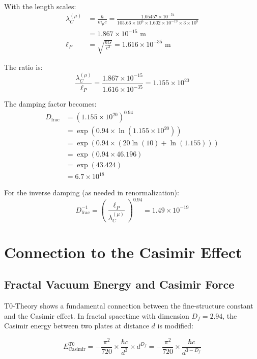 \documentclass[12pt,a4paper]{article}
\theoremstyle{definition}
\begin{document}
	With the length scales:
	\begin{align}
		\lambda_C^{(\mu)} &= \frac{\hbar}{m_\mu c} = \frac{1.05457 \times 10^{-34}}{105.66 \times 10^6 \times 1.602 \times 10^{-19} \times 3 \times 10^8}\\
		&= 1.867 \times 10^{-15} \text{ m}\\
		\ell_P &= \sqrt{\frac{\hbar G}{c^3}} = 1.616 \times 10^{-35} \text{ m}
	\end{align}
	
	The ratio is:
	\begin{equation}
		\frac{\lambda_C^{(\mu)}}{\ell_P} = \frac{1.867 \times 10^{-15}}{1.616 \times 10^{-35}} = 1.155 \times 10^{20}
	\end{equation}
	
	The damping factor becomes:
	\begin{align}
		D_{\text{frac}} &= \left(1.155 \times 10^{20}\right)^{0.94}\\
		&= \exp(0.94 \times \ln(1.155 \times 10^{20}))\\
		&= \exp(0.94 \times (20 \ln(10) + \ln(1.155)))\\
		&= \exp(0.94 \times 46.196)\\
		&= \exp(43.424)\\
		&= 6.7 \times 10^{18}
	\end{align}
	
	For the inverse damping (as needed in renormalization):
	\begin{equation}
		D_{\text{frac}}^{-1} = \left(\frac{\ell_P}{\lambda_C^{(\mu)}}\right)^{0.94} = 1.49 \times 10^{-19}
	\end{equation}
	
	\section{Connection to the Casimir Effect}
	
	\subsection{Fractal Vacuum Energy and Casimir Force}
	
	T0-Theory shows a fundamental connection between the fine-structure constant and the Casimir effect. In fractal spacetime with dimension $D_f = 2.94$, the Casimir energy between two plates at distance $d$ is modified:
	
	\begin{equation}
		E_{\text{Casimir}}^{\text{T0}} = -\frac{\pi^2}{720} \times \frac{\hbar c}{d^3} \times d^{D_f} = -\frac{\pi^2}{720} \times \frac{\hbar c}{d^{3-D_f}}
	\end{equation}
	
\end{document}
